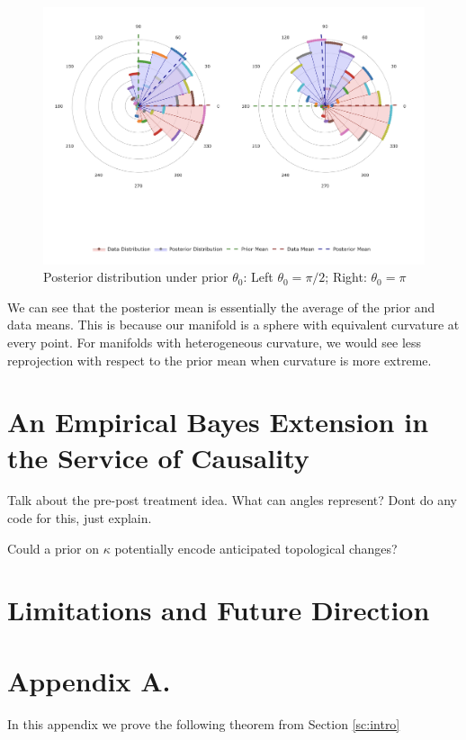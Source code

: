 \documentclass[twoside,11pt]{article}
\begin{document}
\begin{figure}
  \begin{center}
    \includegraphics[width=1\textwidth]{../fig/posterior-roseplot.png}
  \end{center}
  \caption{Posterior distribution under prior $\theta_0$: Left $\theta_0 = \pi/2$; Right: $\theta_0 = \pi$}\label{fig:posteriors}
\end{figure}

We can see that the posterior mean is essentially the average of the prior and data means. This is because our manifold is a sphere with equivalent curvature at every point. For manifolds with heterogeneous curvature, we would see less reprojection with respect to the prior mean when curvature is more extreme.

\begin{figure}
  \begin{center}
    
  \end{center}
  \caption{}\label{fig:}
\end{figure}







\section{An Empirical Bayes Extension in the Service of Causality}

Talk about the pre-post treatment idea. What can angles represent? Dont do any code for this, just explain. 

Could a prior on $\kappa$ potentially encode anticipated topological changes?

\section{Limitations and Future Direction}

\newpage

\appendix
\section*{Appendix A.} \label{sc:app_a}
In this appendix we prove the following theorem from
Section \ref{sc:intro}

\newpage 

\end{document}
